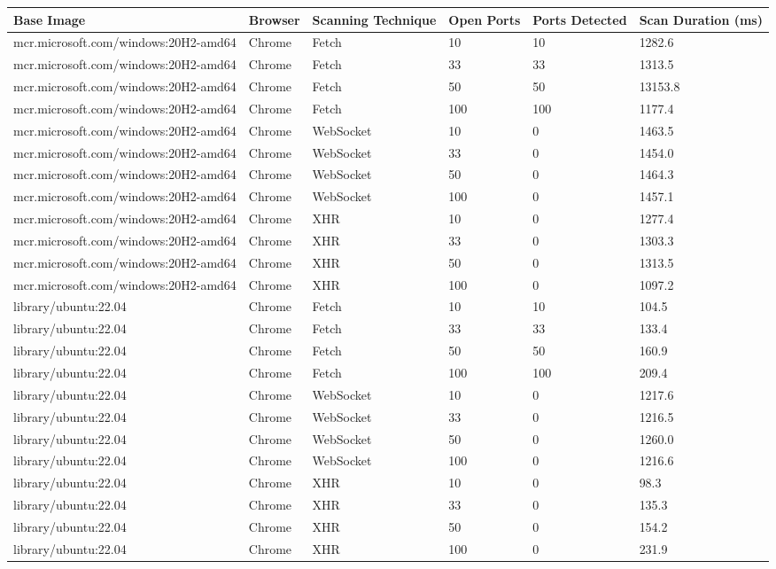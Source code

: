 \begin{table}[htbp]
\footnotesize
\centering
\begin{adjustwidth}{-1.0cm}{}
\begin{tabular}{p{6.3cm}p{1.5cm}p{1.7cm}p{1cm}p{1.3cm}p{3cm}}
    \toprule
    Base Image & Browser & Scanning Technique & Open Ports & Ports Detected & Scan Duration (ms) \\
    \midrule
    mcr.microsoft.com/windows:20H2-amd64 & Chrome & Fetch & 10 & 10 & 1282.6 \\
    mcr.microsoft.com/windows:20H2-amd64 & Chrome & Fetch & 33 & 33 & 1313.5 \\
    mcr.microsoft.com/windows:20H2-amd64 & Chrome & Fetch & 50 & 50 & 13153.8 \\
    mcr.microsoft.com/windows:20H2-amd64 & Chrome & Fetch & 100 & 100 & 1177.4 \\
    \midrule
    mcr.microsoft.com/windows:20H2-amd64 & Chrome & WebSocket & 10 & 0 & 1463.5 \\
    mcr.microsoft.com/windows:20H2-amd64 & Chrome & WebSocket & 33 & 0 & 1454.0 \\
    mcr.microsoft.com/windows:20H2-amd64 & Chrome & WebSocket & 50 & 0 & 1464.3 \\
    mcr.microsoft.com/windows:20H2-amd64 & Chrome & WebSocket & 100 & 0 & 1457.1 \\
    \midrule
    mcr.microsoft.com/windows:20H2-amd64 & Chrome & XHR & 10 & 0 & 1277.4 \\
    mcr.microsoft.com/windows:20H2-amd64 & Chrome & XHR & 33 & 0 & 1303.3 \\
    mcr.microsoft.com/windows:20H2-amd64 & Chrome & XHR & 50 & 0 & 1313.5 \\
    mcr.microsoft.com/windows:20H2-amd64 & Chrome & XHR & 100 & 0 & 1097.2 \\
    \midrule
    library/ubuntu:22.04 & Chrome & Fetch & 10 & 10 & 104.5 \\
    library/ubuntu:22.04 & Chrome & Fetch & 33 & 33 & 133.4 \\
    library/ubuntu:22.04 & Chrome & Fetch & 50 & 50 & 160.9 \\
    library/ubuntu:22.04 & Chrome & Fetch & 100 & 100 & 209.4 \\
    \midrule
    library/ubuntu:22.04 & Chrome & WebSocket & 10 & 0 & 1217.6 \\
    library/ubuntu:22.04 & Chrome & WebSocket & 33 & 0 & 1216.5 \\
    library/ubuntu:22.04 & Chrome & WebSocket & 50 & 0 & 1260.0 \\
    library/ubuntu:22.04 & Chrome & WebSocket & 100 & 0 & 1216.6 \\
    \midrule
    library/ubuntu:22.04 & Chrome & XHR & 10 & 0 & 98.3 \\
    library/ubuntu:22.04 & Chrome & XHR & 33 & 0 & 135.3 \\
    library/ubuntu:22.04 & Chrome & XHR & 50 & 0 & 154.2 \\
    library/ubuntu:22.04 & Chrome & XHR & 100 & 0 & 231.9 \\


\end{tabular}
\end{adjustwidth}
\end{table}

